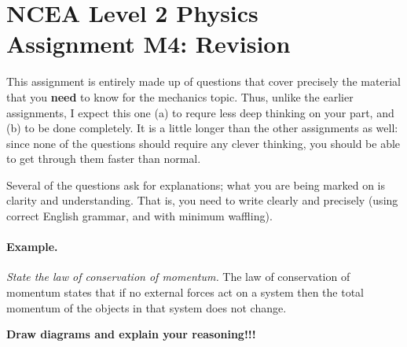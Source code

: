\documentclass[answers]{exam}
\begin{document}
\section*{NCEA Level 2 Physics\\Assignment M4: Revision}
This assignment is entirely made up of questions that cover precisely the material
that you \textbf{need} to know for the mechanics topic. Thus, unlike the earlier
assignments, I expect this one (a) to requre less deep thinking on your part, and
(b) to be done completely.
It is a little longer than the other assignments as well: since none of the questions
should require any clever thinking, you should be able to get through them faster
than normal.

Several of the questions ask for explanations; what you are being marked on is clarity
and understanding. That is, you need to write clearly and precisely (using correct English grammar, and
with minimum waffling).

\paragraph{Example.} \emph{State the law of conservation of momentum.} The law of conservation
of momentum states that if no external forces act on a system then the total momentum of
the objects in that system does not change.


\begin{center}
{\color{red}\large{\textbf{Draw diagrams and explain your reasoning!!!}}}\end{center}
\end{document}
